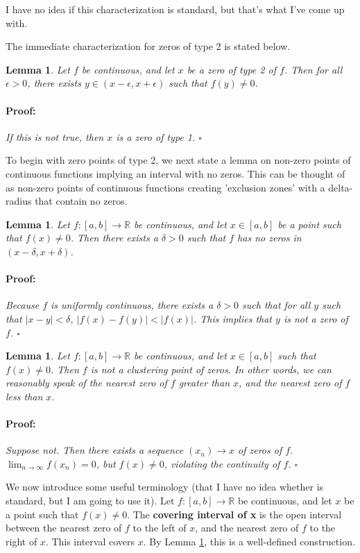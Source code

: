 \documentclass{article}
\newenvironment{proof}{\paragraph{Proof:}}{\hfill$\square$}
\newtheorem{lemma}[theorem]{Lemma}
\newcommand{\R}{\mathbb{R}}
\begin{document}
I have no idea if this characterization is standard, but that's what I've come up with.

The immediate characterization for zeros of type 2 is stated below.

\begin{lemma}
\label{ZeroType2ImpliesNonzeroPoint}
Let $f$ be continuous, and let $x$ be a zero of type 2 of $f$. Then for all $\epsilon > 0$, there exists $y \in (x-\epsilon, x + \epsilon)$ such that $f(y) \neq 0$.
\begin{proof}
If this is not true, then $x$ is a zero of type 1.
\end{proof} 
\end{lemma}

To begin with zero points of type 2, we next state a lemma on non-zero points of continuous functions implying an interval with no zeros. This can be thought of as non-zero points of continuous functions creating 'exclusion zones' with a delta-radius that contain no zeros.

\begin{lemma}
\label{ExclusionZoneDelta}
Let $f: [a, b] \rightarrow \R$ be continuous, and let $x \in [a, b]$ be a point such that $f(x) \neq 0$. Then there exists a $\delta > 0$ such that $f$ has no zeros in $(x-\delta, x+\delta)$.
\begin{proof}
Because $f$ is uniformly continuous, there exists a $\delta > 0$ such that for all $y$ such that $|x-y| < \delta$, $|f(x) - f(y)| < |f(x)|$. This implies that $y$ is not a zero of $f$.
\end{proof}
\end{lemma}

\begin{lemma}
\label{LemmaType2NotCluster}
Let $f: [a, b] \rightarrow \R$ be continuous, and let $x \in [a, b]$ such that $f(x) \neq 0$. Then $f$ is not a clustering point of zeros. In other words, we can reasonably speak of the nearest zero of $f$ greater than $x$, and the nearest zero of $f$ less than $x$.
\begin{proof}
Suppose not. Then there exists a sequence $(x_n) \rightarrow x$ of zeros of $f$. $\lim_{n \rightarrow \infty} f(x_n) = 0$, but $f(x) \neq 0$, violating the continuity of $f$.
\end{proof}
\end{lemma}

We now introduce some useful terminology (that I have no idea whether is standard, but I am going to use it). Let $f: [a, b] \rightarrow \R$ be continuous, and let $x$ be a point such that $f(x) \neq 0$. The \textbf{covering interval of x} is the open interval between the nearest zero of $f$ to the left of $x$, and the nearest zero of $f$ to the right of $x$. This interval covers $x$. By Lemma \ref{LemmaType2NotCluster}, this is a well-defined construction.
\end{document}
